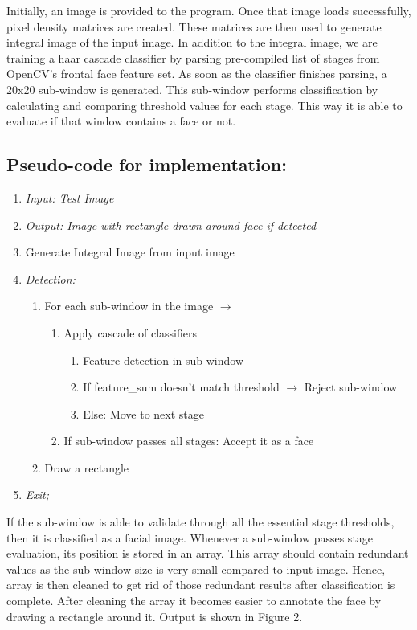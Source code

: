 \documentclass[12pt]{elsarticle}
\begin{document}
Initially, an image is provided to the program. Once that image loads successfully, pixel density matrices are created. These matrices are then used to generate integral image of the input image. In addition to the integral image, we are training a haar cascade classifier by parsing pre-compiled list of stages from OpenCV's frontal face feature set. As soon as the classifier finishes parsing, a 20x20 sub-window is generated. This sub-window performs classification by calculating and comparing threshold values for each stage. This way it is able to evaluate if that window contains a face or not. 

\subsection{\textbf{Pseudo-code for implementation:}}
\begin{enumerate}
	\item \textit{Input: Test Image}
    \item \textit{Output: Image with rectangle drawn around face if detected}
   	\item Generate Integral Image from input image
    \item \textit{Detection:}
    \begin{enumerate}
    	\item[] For each sub-window in the image $\to$
        \begin{enumerate}
			\item[] Apply cascade of classifiers
            \begin{enumerate}
				\item[] Feature detection in sub-window
				\item[] If feature\_sum doesn't match threshold $\to$
                		 \subitem Reject sub-window
                \item[] Else:
                		 \subitem Move to next stage
        	\end{enumerate}
			\item[] If sub-window passes all stages:
            		\subitem Accept it as a face
        \end{enumerate}
        \item[] Draw a rectangle
    \end{enumerate}
    \item \textit{Exit;}
\end{enumerate}

If the sub-window is able to validate through all the essential stage thresholds, then it is classified as a facial image. Whenever a sub-window passes stage evaluation, its position is stored in an array. This array should contain redundant values as the sub-window size is very small compared to input image. Hence, array is then cleaned to get rid of those redundant results after classification is complete. After cleaning the array it becomes easier to annotate the face by drawing a rectangle around it. Output is shown in Figure 2.
\end{document}
